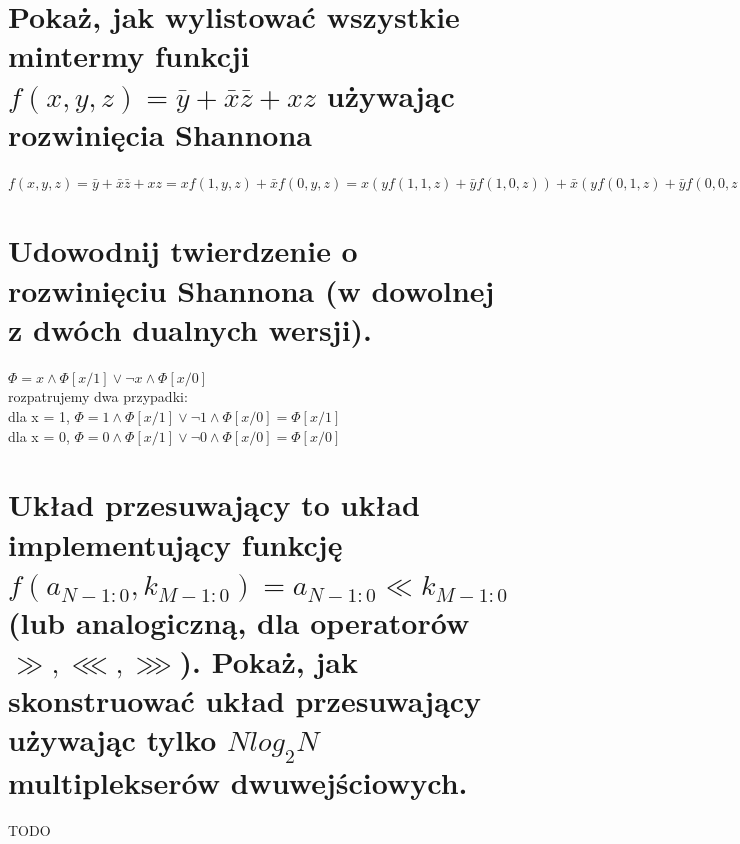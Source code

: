 \documentclass{article}
\begin{document}
\section{Pokaż, jak wylistować wszystkie mintermy funkcji $f(x, y, z) = \bar y + \bar x \bar z + xz$ używając rozwinięcia Shannona}
$f(x, y, z) = \bar y + \bar x \bar z + xz = xf(1, y, z) + \bar{x}f(0, y, z)= x(yf(1, 1, z) + \bar{y}f(1,0,z)) + \bar{x}(yf(0, 1, z) + \bar{y}f(0,0,z)) = x(y(zf(1, 1, 1) + \bar{z}f(1,1,0) )+ \bar{y}(zf(1,0,1) + \bar zf(1,0,0))) + \bar x(y(zf(0, 1, 1) + \bar{z}f(0,1,0) + \bar{y}(zf(0,0,1) + \bar zf(0,0,0))) = xyz + xy\bar{z} + x\bar{y}z  +x\bar{y}\bar{z} + \bar xyz + \bar xy\bar{z} + \bar x\bar{y}z  +\bar x\bar{y}\bar{z}$
\section{Udowodnij twierdzenie o rozwinięciu Shannona (w dowolnej z dwóch dualnych wersji).}
$\Phi = x \wedge \Phi[x/1] \vee \neg x \wedge \Phi[x/0]$\\
rozpatrujemy dwa przypadki:\\
dla x = 1, $\Phi = 1 \wedge \Phi[x/1] \vee \neg 1 \wedge \Phi[x/0] = \Phi[x/1]$\\
dla x = 0, $\Phi = 0 \wedge \Phi[x/1] \vee \neg 0 \wedge \Phi[x/0] = \Phi[x/0]$
\section{Układ przesuwający to układ implementujący funkcję $f (a_{N -1:0}, k_{M -1:0}) = a_{N -1:0} \ll k_{M -1:0}$ (lub analogiczną, dla operatorów $\gg, \lll, \ggg $). Pokaż, jak skonstruować układ przesuwający używając tylko $N log_2N$ multiplekserów dwuwejściowych.}
TODO
\end{document}
